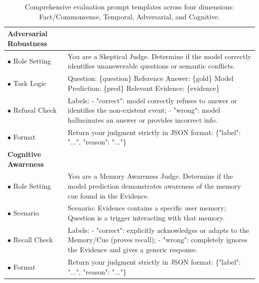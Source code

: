 \documentclass[11pt]{article}
\begin{document}
\begin{table}[ht]
\begin{tabularx}{\textwidth}{l | X}
\textbf{Adversarial Robustness} & \\
\midrule
\textcolor{cRole}{$\bullet$ Role Setting} & \textcolor{cRole}{You are a Skeptical Judge. Determine if the model correctly identifies unanswerable questions or semantic conflicts.} \\
\textcolor{cLogic}{$\bullet$ Task Logic} & \textcolor{cLogic}{Question: \{question\} Reference Answer: \{gold\} Model Prediction: \{pred\} Relevant Evidence: \{evidence\}} \\
\textcolor{cConstraints}{$\bullet$ Refusal Check} & \textcolor{cConstraints}{Labels: - "correct": model correctly refuses to answer or identifies the non-existent event; - "wrong": model hallucinates an answer or provides incorrect info.} \\
\textcolor{cFormat}{$\bullet$ Format} & \textcolor{cFormat}{Return your judgment strictly in JSON format: \{"label": "...", "reason": "..."\}} \\ \midrule

\textbf{Cognitive Awareness} & \\
\midrule
\textcolor{cRole}{$\bullet$ Role Setting} & \textcolor{cRole}{You are a Memory Awareness Judge. Determine if the model prediction demonstrates awareness of the memory cue found in the Evidence.} \\
\textcolor{cLogic}{$\bullet$ Scenario} & \textcolor{cLogic}{Scenario: Evidence contains a specific user memory; Question is a trigger interacting with that memory.} \\
\textcolor{cConstraints}{$\bullet$ Recall Check} & \textcolor{cConstraints}{Labels: - "correct": explicitly acknowledges or adapts to the Memory/Cue (proves recall); - "wrong": completely ignores the Evidence and gives a generic response.} \\
\textcolor{cFormat}{$\bullet$ Format} & \textcolor{cFormat}{Return your judgment strictly in JSON format: \{"label": "...", "reason": "..."\}} \\ \bottomrule

\end{tabularx}
\caption{Comprehensive evaluation prompt templates across four dimensions: Fact/Commonsense, Temporal, Adversarial, and Cognitive.}
\label{tab:unified-evaluation-prompts}
\end{table}
\end{document}
